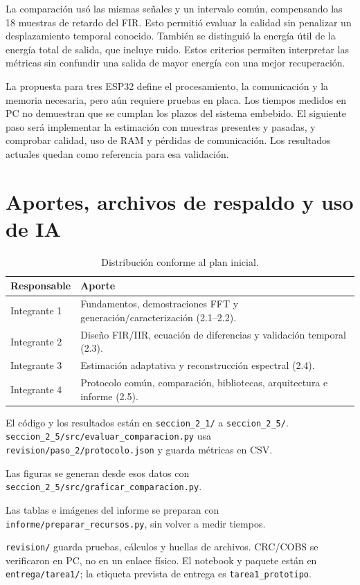\documentclass[11pt,a4paper]{article}
\newcommand{\ruta}[1]{\nolinkurl{#1}}
\begin{document}
La comparación usó las mismas señales y un intervalo común, compensando las 18 muestras de retardo del FIR. Esto permitió evaluar la calidad sin penalizar un desplazamiento temporal conocido. También se distinguió la energía útil de la energía total de salida, que incluye ruido. Estos criterios permiten interpretar las métricas sin confundir una salida de mayor energía con una mejor recuperación.

La propuesta para tres ESP32 define el procesamiento, la comunicación y la memoria necesaria, pero aún requiere pruebas en placa. Los tiempos medidos en PC no demuestran que se cumplan los plazos del sistema embebido. El siguiente paso será implementar la estimación con muestras presentes y pasadas, y comprobar calidad, uso de RAM y pérdidas de comunicación. Los resultados actuales quedan como referencia para esa validación.

\section{Aportes, archivos de respaldo y uso de IA}
\begin{table}[H]\centering\caption{Distribución conforme al plan inicial.}\begin{tabular}{lp{10cm}}\toprule Responsable&Aporte\\\midrule Integrante 1&Fundamentos, demostraciones FFT y generación/caracterización (2.1--2.2).\\Integrante 2&Diseño FIR/IIR, ecuación de diferencias y validación temporal (2.3).\\Integrante 3&Estimación adaptativa y reconstrucción espectral (2.4).\\Integrante 4&Protocolo común, comparación, bibliotecas, arquitectura e informe (2.5).\\\bottomrule\end{tabular}\end{table}
El código y los resultados están en \ruta{seccion_2_1/} a \ruta{seccion_2_5/}. \ruta{seccion_2_5/src/evaluar_comparacion.py} usa \ruta{revision/paso_2/protocolo.json} y guarda métricas en CSV.

Las figuras se generan desde esos datos con \ruta{seccion_2_5/src/graficar_comparacion.py}.

Las tablas e imágenes del informe se preparan con \ruta{informe/preparar_recursos.py}, sin volver a medir tiempos.

\ruta{revision/} guarda pruebas, cálculos y huellas de archivos. CRC/COBS se verificaron en PC, no en un enlace físico. El notebook y paquete están en \ruta{entrega/tarea1/}; la etiqueta prevista de entrega es \ruta{tarea1_prototipo}.
\end{document}
